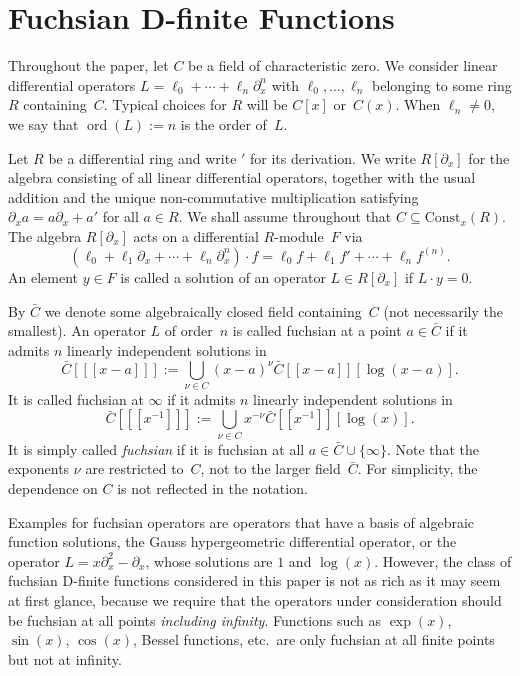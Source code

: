 \documentclass[final,1p,times,authoryear]{elsarticle}
\def\ord{\operatorname{ord}}
\begin{document}
\section{Fuchsian D-finite Functions}

Throughout the paper, let $C$ be a field of characteristic zero. We consider linear differential operators
$L=\ell_0+\cdots+\ell_n\partial_x^n$ with $\ell_0,\dots,\ell_n$ belonging to some ring
$R$ containing~$C$. Typical choices for $R$ will be $C[x]$ or~$C(x)$.
When $\ell_n\neq0$, we say that $\ord(L):=n$ is the order of~$L$.

Let $R$ be a differential ring and write $'$ for its derivation.
We write $R[\partial_x]$ for the algebra consisting of all linear differential operators, together
with the usual addition and the unique non-commutative multiplication satisfying
$\partial_xa=a\partial_x+a'$ for all $a\in R$. We shall assume throughout that $C\subseteq\mathrm{Const}_x(R)$.
The algebra $R[\partial_x]$ acts on a differential $R$-module~$F$ via
\[
  (\ell_0+\ell_1\partial_x+\cdots+\ell_n\partial_x^n)\cdot f=
   \ell_0f + \ell_1f' + \cdots + \ell_n f^{(n)}.
\]
An element $y\in F$ is called a solution of an operator $L\in R[\partial_x]$ if
$L\cdot y=0$.

By $\bar C$ we denote some algebraically closed field containing~$C$ (not necessarily the smallest).
An operator $L$ of order~$n$ is called fuchsian at a point $a\in\bar C$ if
it admits $n$ linearly independent solutions in
\[
  \bar C[[[x-a]]] := \bigcup_{\nu\in C} (x-a)^\nu\bar C[[x-a]][\log(x-a)].
\]
It is called fuchsian at $\infty$ if it admits $n$ linearly independent solutions in
\[
  \bar C[[[x^{-1}]]] := \bigcup_{\nu\in C} x^{-\nu} \bar C[[x^{-1}]][\log(x)].
\]
It is simply called \emph{fuchsian} if it is fuchsian at all $a\in\bar C\cup\{\infty\}$.
Note that the exponents $\nu$ are restricted to~$C$, not to the larger field~$\bar C$.
For simplicity, the dependence on $C$ is not reflected in the notation.

Examples for fuchsian operators are operators that have a basis of algebraic
function solutions, the Gauss hypergeometric differential operator, or the
operator $L=x\partial_x^2-\partial_x$, whose solutions are $1$ and $\log(x)$.
However, the class of fuchsian D-finite functions
considered in this paper is not as rich as it may seem at first glance, because
we require that the operators under consideration should be fuchsian at all
points \emph{including infinity}. Functions
such as $\exp(x)$, $\sin(x)$, $\cos(x)$, Bessel functions, etc.\ are only
fuchsian at all finite points but not at infinity.
\end{document}
